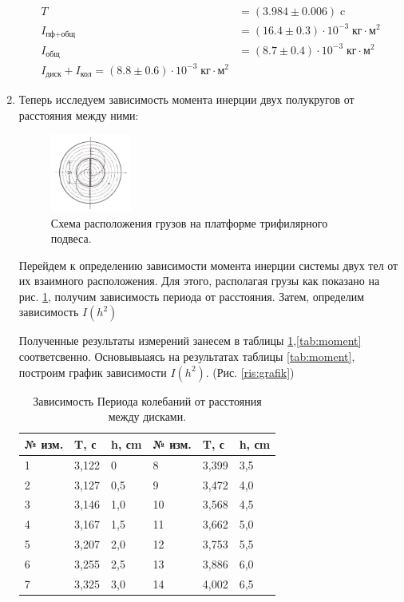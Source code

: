 \documentclass[a4, 12pt]{article}
\begin{document}
\begin{enumerate}
    \begin{align*}
    T &= (3.984 \pm 0.006)\;\text{c} \\
    I_\text{пф+общ}&=(16.4 \pm 0.3)\cdot10^{-3}\;\text{кг}\cdot\text{м}^2 \\
    I_\text{общ}&=(8.7 \pm 0.4)\cdot10^{-3}\;\text{кг}\cdot\text{м}^2 \\
    I_\text{диск} + I_\text{кол}  = (8.8 \pm 0.6)\cdot10^{-3}\;\text{кг}\cdot\text{м}^2
    \end{align*}
	\item Теперь исследуем зависимость момента инерции двух полукругов от расстояния между ними:
			\begin{figure}[H]
			\includegraphics[width=0.25\textwidth]{position}
			\caption{Схема расположения грузов на платформе трифилярного подвеса.}
			\label{ris:position}
		\end{figure}

		Перейдем к определению зависимости момента инерции системы двух тел от их взаимного расположения. Для этого, располагая грузы как показано на рис. \ref{ris:position}, получим зависимость периода от расстояния. Затем, определим зависимость $ I(h^{2}) $

		Полученные результаты измерений занесем в таблицы \ref{tab:period},\ref{tab:moment} соответсвенно. Основывыаясь на результатах таблицы \ref{tab:moment}, построим график зависимости $ I(h^{2}) $. (Рис. \ref{ris:grafik})


		\begin{table}[H]
			\begin{center}
				\begin{tabular}{| l | l | l || l | l | l |}
					\hline
					№ изм. & T, с & h, сm & № изм. & T, с & h, сm \\ \hline
					1 & 3,122 & 0 & 8 & 3,399 & 3,5 \\ \hline
					2 & 3,127 & 0,5 & 9 & 3,472 & 4,0 \\ \hline
					3 & 3,146 & 1,0 & 10 & 3,568 & 4,5 \\ \hline
					4 & 3,167 & 1,5 & 11 & 3,662 & 5,0 \\ \hline
					5 & 3,207 & 2,0 & 12 & 3,753 & 5,5 \\ \hline
					6 & 3,255 & 2,5 & 13 & 3,886 & 6,0 \\ \hline
					7 & 3,325 & 3,0 & 14 & 4,002 & 6,5 \\ \hline
				\end{tabular}
				\caption{Зависимость Периода колебаний от расстояния между дисками.}
				\label{tab:period}
			\end{center}
		\end{table}


\end{enumerate}
\end{document}
